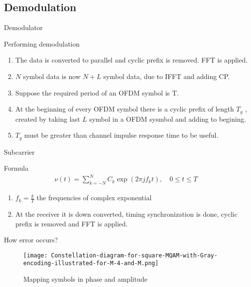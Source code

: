 \documentclass{beamer}
\begin{document}
\subsection{Demodulation}
\begin{frame}{Demodulator}
    \begin{block}{Performing demodulation}
    \begin{enumerate}
        \item The data is converted to parallel and cyclic prefix is removed. FFT is applied.
        \item $N$ symbol data is now $N+L$ symbol data, due to IFFT and adding CP.
        \item Suppose the required period of an OFDM symbol is T. 
        \item At the beginning of every OFDM symbol there is a cyclic prefix of length $T_g$ , created by taking last $L$ symbol in a OFDM sysmbol and adding to begining. 
        \item $T_g$ must be greater than channel impulse response time to be useful. 
    \end{enumerate}
    \end{block}
\end{frame}
\begin{frame}{Subcarrier}
\begin{block}{Formula}
\begin{align}
    \nu(t)=\sum_{k=-N}^N C_k \exp{(2\pi jf_kt)}, \quad {0 \leq t\leq T}
\end{align}
\begin{enumerate}
    \item $f_k=\frac{k}{T}$ the frequencies of complex exponential
    \item At the receiver it is down converted, timing synchronization is done, cyclic prefix is removed and FFT is applied.
\end{enumerate}
\end{block}
    
\end{frame}
\begin{frame}{How error occurs?}
\begin{figure}
    \centering
    \texttt{[image: Constellation-diagram-for-square-MQAM-with-Gray-encoding-illustrated-for-M-4-and-M.png]}
    \caption{Mapping symbols in phase and amplitude}
    \label{fig:constlation}
\end{figure}
    
\end{frame}
\end{document}
